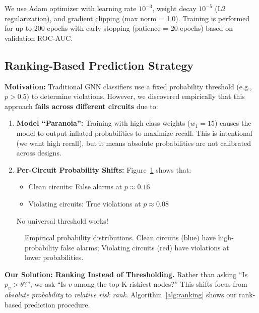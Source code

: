 \documentclass[10pt,twocolumn,journal]{IEEEtran}
\begin{document}
We use Adam optimizer with learning rate $10^{-3}$, weight decay $10^{-5}$ (L2 regularization), and gradient clipping (max norm = 1.0). Training is performed for up to 200 epochs with early stopping (patience = 20 epochs) based on validation ROC-AUC.

\subsection{Ranking-Based Prediction Strategy}

\textbf{Motivation:}
Traditional GNN classifiers use a fixed probability threshold (e.g., $p > 0.5$) to determine violations. However, we discovered empirically that this approach \textbf{fails across different circuits} due to:
\begin{enumerate}
    \item \textbf{Model ``Paranoia'':} Training with high class weights ($w_1 = 15$) causes the model to output inflated probabilities to maximize recall. This is intentional (we want high recall), but it means absolute probabilities are not calibrated across designs.
    
    \item \textbf{Per-Circuit Probability Shifts:} Figure~\ref{fig:prob_dist} shows that:
    \begin{itemize}
        \item Clean circuits: False alarms at $p \approx 0.16$
        \item Violating circuits: True violations at $p \approx 0.08$
    \end{itemize}
    No universal threshold works!
\end{enumerate}

\begin{figure}[t]
\centering
{}
\caption{Empirical probability distributions. Clean circuits (blue) have high-probability false alarms; Violating circuits (red) have violations at lower probabilities.}
\label{fig:prob_dist}
\end{figure}

\textbf{Our Solution: Ranking Instead of Thresholding.}
Rather than asking ``Is $p_v > \theta$?'', we ask ``Is $v$ among the top-K riskiest nodes?'' This shifts focus from \textit{absolute probability} to \textit{relative risk rank}. Algorithm~\ref{alg:ranking} shows our rank-based prediction procedure.
\end{document}
